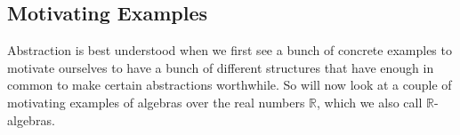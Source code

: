 






\subsection{Motivating Examples}
Abstraction is best understood when we first see a bunch of concrete examples to motivate ourselves to have a bunch of different structures that have enough in common to make certain abstractions worthwhile. So will now look at a couple of motivating examples of algebras over the real numbers $\mathbb{R}$, which we also call $\mathbb{R}$-algebras.


